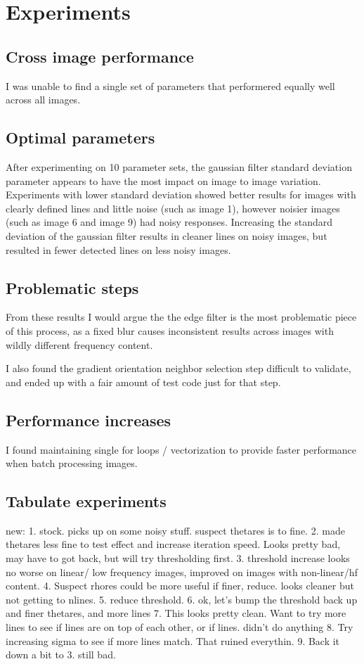 \documentclass[12pt]{article}
\begin{document}
\newpage
\section{Experiments}
\subsection{Cross image performance}
I was unable to find a single set of parameters that performered equally well across all images.

\newpage
\subsection{Optimal parameters}
After experimenting on 10 parameter sets, the gaussian filter standard deviation parameter appears to have the most impact on image to image variation. Experiments with lower standard deviation showed better results for images with clearly defined lines and little noise (such as image 1), however noisier images (such as image 6 and image 9) had noisy responses.
Increasing the standard deviation of the gaussian filter results in cleaner lines on noisy images, but resulted in fewer detected lines on less noisy images.

\newpage
\subsection{Problematic steps}
From these results I would argue the the edge filter is the most problematic piece of this process, as a fixed blur causes inconsistent results across images with wildly different frequency content.

I also found the gradient orientation neighbor selection step difficult to validate, and ended up with a fair amount of test code just for that step. 

\newpage
\subsection{Performance increases}
I found maintaining single for loops / vectorization to provide faster performance when batch processing images.

\newpage
\subsection{Tabulate experiments}

new:
1. stock. picks up on some noisy stuff. suspect thetares is to fine.
2. made thetares less fine to test effect and increase iteration speed. Looks pretty bad, may have to got back, but will try thresholding first.
3. threshold increase looks no worse on linear/ low frequency images, improved on images with non-linear/hf content.
4. Suspect rhores could be more useful if finer, reduce. looks cleaner but not getting to nlines.
5. reduce threshold.
6. ok, let's bump the threshold back up and finer thetares, and more lines
7. This looks pretty clean. Want to try more lines to see if lines are on top of each other, or if lines. didn't do anything
8. Try increasing sigma to see if more lines match. That ruined everythin.
9. Back it down a bit to 3. still bad.
\end{document}

